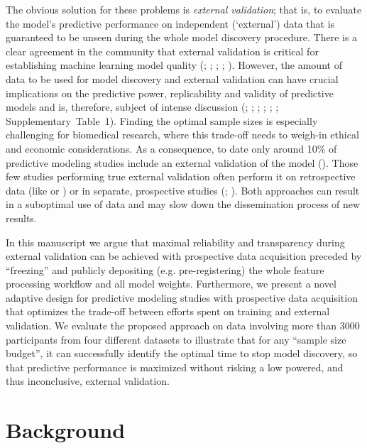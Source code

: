 \documentclass{article}
\begin{document}
The obvious solution for these problems is \textit{external validation}; that is, to evaluate the model's predictive performance on independent (`external') data that is guaranteed to be unseen during the whole model discovery procedure. There is a clear agreement in the community that external validation is critical for establishing machine learning model quality (\cite{Collins_2014}; \cite{Ho_2020}; \cite{Yu_2022}; \cite{Spisak_2023}; \cite{Poldrack_2020}). However, the amount of data to be used for model discovery and external validation can have crucial implications on the predictive power, replicability and validity of predictive models and is, therefore, subject of intense discussion (\cite{Riley_2021}; \cite{Marek_2022}; \cite{Spisak_2023}; \cite{Rosenberg_2022}; \cite{Thirion_2023}; \cite{Makowski_2023}; Supplementary~Table~1). Finding the optimal sample sizes is especially challenging for biomedical research, where this trade-off needs to weigh-in ethical and economic considerations. As a consequence, to date only around 10\% of predictive modeling studies include an external validation of the model (\cite{Yang_2022}). Those few studies performing true external validation often perform it on retrospective data (like \cite{Lee_2021} or \cite{Kincses_2023}) or in separate, prospective studies (\cite{Spisak_2020}; \cite{Kincses_2023}). Both approaches can result in a suboptimal use of data and may slow down the dissemination process of new results.

In this manuscript we argue that maximal reliability and transparency during external validation can be achieved with prospective data acquisition preceded by ``freezing'' and publicly depositing (e.g. pre-registering) the whole feature processing workflow and all model weights. Furthermore, we present a novel adaptive design for predictive modeling studies with prospective data acquisition that optimizes the trade-off between efforts spent on training and external validation. We evaluate the proposed approach on data involving more than 3000 participants from four different datasets to illustrate that for any ``sample size budget'', it can successfully identify the optimal time to stop model discovery, so that predictive performance is maximized without risking a low powered, and thus inconclusive, external validation.

\section{Background}
\end{document}
